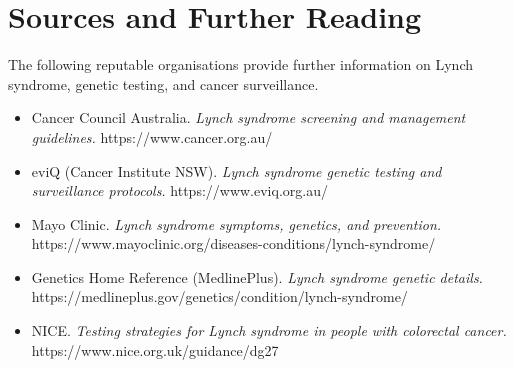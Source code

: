\section*{Sources and Further Reading}
The following reputable organisations provide further information on Lynch syndrome, genetic testing, and cancer surveillance.
\begin{itemize}
    \item Cancer Council Australia. \textit{Lynch syndrome screening and management guidelines.} https://www.cancer.org.au/
    \item eviQ (Cancer Institute NSW). \textit{Lynch syndrome genetic testing and surveillance protocols.} https://www.eviq.org.au/
    \item Mayo Clinic. \textit{Lynch syndrome symptoms, genetics, and prevention.} https://www.mayoclinic.org/diseases-conditions/lynch-syndrome/
    \item Genetics Home Reference (MedlinePlus). \textit{Lynch syndrome genetic details.} https://medlineplus.gov/genetics/condition/lynch-syndrome/
    \item NICE. \textit{Testing strategies for Lynch syndrome in people with colorectal cancer.} https://www.nice.org.uk/guidance/dg27
\end{itemize}
